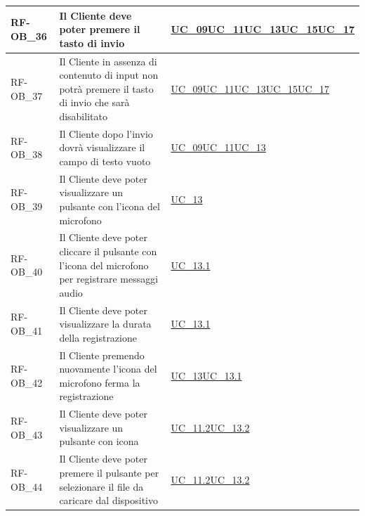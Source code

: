 \begin{longtable}{|>{\raggedright}p{}|>{\raggedright\arraybackslash}p{}|>{\raggedright\arraybackslash}p{}|}
	\hline
	RF-OB\_36 \hypertarget{rf-ob_36} & Il Cliente deve poter premere il tasto di invio & \hyperref[uc_09]{UC\_09}\newline \hyperref[uc_11]{UC\_11}\newline \hyperref[uc_13]{UC\_13}\newline \hyperref[uc_15]{UC\_15}\newline \hyperref[uc_17]{UC\_17} \\
	\hline
	RF-OB\_37 \hypertarget{rf-ob_37} & Il Cliente in assenza di contenuto di input non potrà premere il tasto di invio che sarà disabilitato & \hyperref[uc_09]{UC\_09}\newline \hyperref[uc_11]{UC\_11}\newline \hyperref[uc_13]{UC\_13}\newline \hyperref[uc_15]{UC\_15}\newline \hyperref[uc_17]{UC\_17} \\
	\hline
	RF-OB\_38 \hypertarget{rf-ob_38} & Il Cliente dopo l'invio dovrà visualizzare il campo di testo vuoto & \hyperref[uc_09]{UC\_09}\newline \hyperref[uc_11]{UC\_11}\newline \hyperref[uc_13]{UC\_13} \\
	\hline
	RF-OB\_39 \hypertarget{rf-ob_39} & Il Cliente deve poter visualizzare un pulsante con l'icona del microfono & \hyperref[uc_13]{UC\_13} \\
	\hline
	RF-OB\_40 \hypertarget{rf-ob_40} & Il Cliente deve poter cliccare il pulsante con l'icona del microfono per registrare messaggi audio & \hyperref[uc_13.1]{UC\_13.1} \\
	\hline
	RF-OB\_41 \hypertarget{rf-ob_41} & Il Cliente deve poter visualizzare la durata della registrazione & \hyperref[uc_13.1]{UC\_13.1} \\
	\hline
	RF-OB\_42 \hypertarget{rf-ob_42} & Il Cliente premendo nuovamente l'icona del microfono ferma la registrazione & \hyperref[uc_13]{UC\_13}\newline \hyperref[uc_13.1]{UC\_13.1} \\
	\hline
	RF-OB\_43 \hypertarget{rf-ob_43} & Il Cliente deve poter visualizzare un pulsante con icona \vr{clip} & \hyperref[uc_11.2]{UC\_11.2}\newline \hyperref[uc_13.2]{UC\_13.2} \\
	\hline
	RF-OB\_44 \hypertarget{rf-ob_44} & Il Cliente deve poter premere il pulsante per selezionare il file da caricare dal dispositivo & \hyperref[uc_11.2]{UC\_11.2}\newline \hyperref[uc_13.2]{UC\_13.2} \\

\end{longtable}
